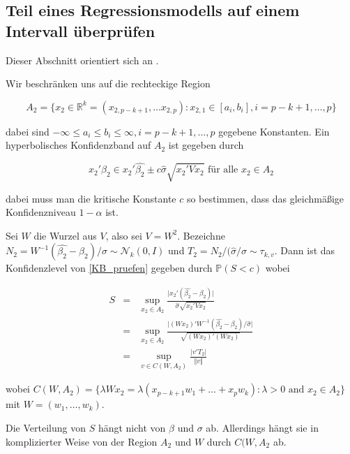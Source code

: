 \documentclass[12pt,a4paper]{article}
\theoremstyle{definition}
\theoremstyle{definition}
\theoremstyle{definition}
\theoremstyle{definition}
\begin{document}
\subsection{Teil eines Regressionsmodells auf einem Intervall überprüfen}
\label{Teil eines Regressionsmodells auf einem Intervall überpruefen}
Dieser Abschnitt orientiert sich an \cite[102-105]{Liu64}.

Wir beschränken uns auf die rechteckige Region

\begin{equation*}
A_2 = \{ x_2 \in \mathbb{R}^k =(x_{2,p-k+1}, \ldots x_{2,p}) : x_{2,1} \in [a_i,b_i], i=p-k+1, \ldots, p \}
\end{equation*}

dabei sind $- \infty \leq a_i \leq b_i \leq \infty, i = p-k+1, \ldots, p$ gegebene Konstanten. Ein hyperbolisches Konfidenzband auf $A_2$ ist gegeben durch

\begin{equation}\label{KB_pruefen}
x_2'\beta_2 \in x_2'\hat{\beta_2} \pm c \hat{\sigma}\sqrt{x_2'Vx_2} \text{ für alle } x_2 \in A_2
\end{equation}

dabei muss man die kritische Konstante $c$ so bestimmen, dass das gleichmäßige Konfidenzniveau $1 - \alpha$ ist.

Sei $W$ die Wurzel aus $V$, also sei $V=W^2$. Bezeichne $N_2=W^{-1}(\hat{\beta_2}-\beta_2)/\sigma \sim \mathscr{N}_{k}(0,I)$ und $T_2 = N_2/(\hat{\sigma}/\sigma \sim \tau_{k,v}$. Dann ist das Konfidenzlevel von \eqref{KB_pruefen} gegeben durch $\mathbb{P}(S<c)$ wobei

\begin{eqnarray*}
S &=& \sup_{x_2 \in A_2} \frac{\vert x_2' (\hat{\beta_2} - \beta_2) \vert }{\hat{\sigma} \sqrt{x_2' V  x_2}} \\
&=& \sup_{x_2 \in A_2} \frac{\vert (Wx_2)'W^{-1} (\hat{\beta_2}-\beta_2)/\hat{\sigma} \vert}{\sqrt{(Wx_2)'(Wx_2)}} \\
&=& \sup_{v \in C(W,A_2)} \frac{\vert v'T_2 \vert }{\Vert v \Vert}
\end{eqnarray*}

wobei $C(W,A_2)=\{ \lambda W x_2 = \lambda(x_{p-k+1} w_1 + \ldots + x_p w_k) : \lambda > 0 \text{ and } x_2 \in A_2 \}$ mit $W=(w_1, \ldots, w_k)$. 

Die Verteilung von $S$ hängt nicht von $\beta$ und $\sigma$ ab. Allerdings hängt sie in komplizierter Weise von der Region $A_2$ und $W$ durch $C(W,A_2$ ab.
\end{document}
